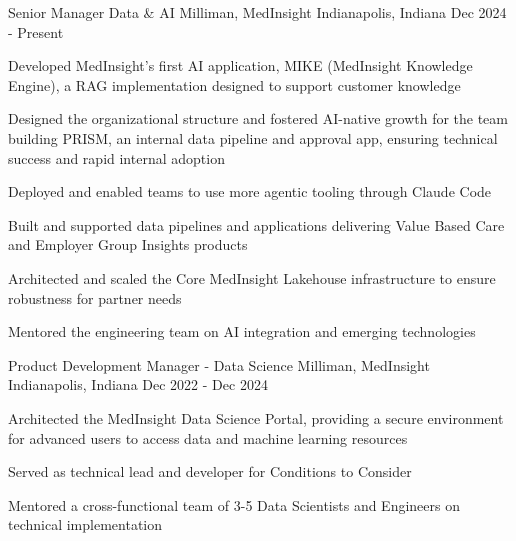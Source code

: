 

\begin{cventries}

  \cventry
    {Senior Manager Data \& AI} %
    {Milliman, MedInsight} %
    {Indianapolis, Indiana} %
    {Dec 2024 - Present} %
    {
      \begin{cvitems} %
        \item {Developed MedInsight's first AI application, MIKE (MedInsight Knowledge Engine), a RAG implementation designed to support customer knowledge}
        \item {Designed the organizational structure and fostered AI-native growth for the team building PRISM, an internal data pipeline and approval app, ensuring technical success and rapid internal adoption}
        \item {Deployed and enabled teams to use more agentic tooling through Claude Code}
        \item {Built and supported data pipelines and applications delivering Value Based Care and Employer Group Insights products}
        \item {Architected and scaled the Core MedInsight Lakehouse infrastructure to ensure robustness for partner needs}
        \item {Mentored the engineering team on AI integration and emerging technologies}
      \end{cvitems}
    }

  \cventry
    {Product Development Manager - Data Science} %
    {Milliman, MedInsight} %
    {Indianapolis, Indiana} %
    {Dec 2022 - Dec 2024} %
    {
      \begin{cvitems} %
        \item {Architected the MedInsight Data Science Portal, providing a secure environment for advanced users to access data and machine learning resources}
        \item {Served as technical lead and developer for Conditions to Consider}
        \item {Mentored a cross-functional team of 3-5 Data Scientists and Engineers on technical implementation}
      \end{cvitems}
    }


\end{cventries}
